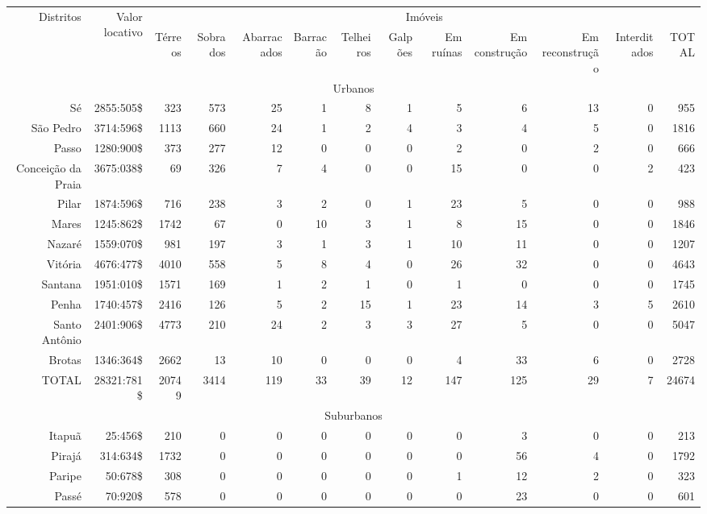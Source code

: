 \begin{landscape}
\begin{table}[!tp]
{
\begin{tiny}
\begin{tabular}{rrrrrrrrrrrrr}
\hline
\multirow{2}{*}{Distritos}&\multirow{2}{*}{Valor locativo}&\multicolumn{11}{c}{Imóveis}\\
\cline{3-13}
	&	&Térreos	&Sobrados	&Abarracados	&Barracão	&Telheiros	&Galpões	&Em ruínas	&Em construção	&Em reconstrução	&Interditados	&TOTAL\\
\hline 
\hline 
\multicolumn{13}{c}{Urbanos}\\
\hline 
Sé	&2855:505\$	&323	&573	&25	&1	&8	&1	&5	&6	&13	&0	&955\\
São Pedro	&3714:596\$	&1113	&660	&24	&1	&2	&4	&3	&4	&5	&0	&1816\\
Passo	&1280:900\$	&373	&277	&12	&0	&0	&0	&2	&0	&2	&0	&666\\
Conceição da Praia	&3675:038\$	&69	&326	&7	&4	&0	&0	&15	&0	&0	&2	&423\\
Pilar	&1874:596\$	&716	&238	&3	&2	&0	&1	&23	&5	&0	&0	&988\\
Mares	&1245:862\$	&1742	&67	&0	&10	&3	&1	&8	&15	&0	&0	&1846\\
Nazaré	&1559:070\$	&981	&197	&3	&1	&3	&1	&10	&11	&0	&0	&1207\\
Vitória	&4676:477\$	&4010	&558	&5	&8	&4	&0	&26	&32	&0	&0	&4643\\
Santana	&1951:010\$	&1571	&169	&1	&2	&1	&0	&1	&0	&0	&0	&1745\\
Penha	&1740:457\$	&2416	&126	&5	&2	&15	&1	&23	&14	&3	&5	&2610\\
Santo Antônio	&2401:906\$	&4773	&210	&24	&2	&3	&3	&27	&5	&0	&0	&5047\\
Brotas	&1346:364\$	&2662	&13	&10	&0	&0	&0	&4	&33	&6	&0	&2728\\
TOTAL 	&28321:781\$	&20749	&3414	&119	&33	&39	&12	&147	&125	&29	&7	&24674\\
\hline
\multicolumn{13}{c}{Suburbanos}\\
\hline
Itapuã	&25:456\$	&210	&0	&0	&0	&0	&0	&0	&3	&0	&0	&213\\
Pirajá	&314:634\$	&1732	&0	&0	&0	&0	&0	&0	&56	&4	&0	&1792\\
Paripe	&50:678\$	&308	&0	&0	&0	&0	&0	&1	&12	&2	&0	&323\\
Passé	&70:920\$	&578	&0	&0	&0	&0	&0	&0	&23	&0	&0	&601\\

\end{tabular}
\end{tiny}}
\end{table}
\end{landscape}
